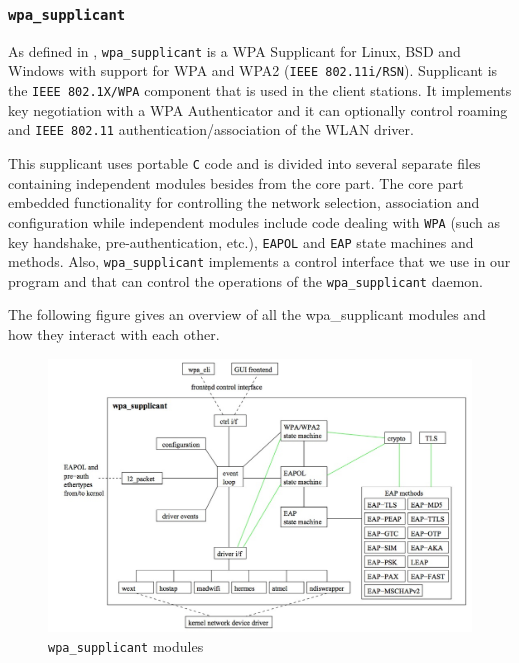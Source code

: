 \subsubsection{\texttt{wpa\_supplicant}} %
 As defined in \cite{wpa-supplicant}, \texttt{wpa\_supplicant} is a WPA Supplicant for Linux, BSD and Windows with support for WPA and WPA2 (\texttt{IEEE 802.11i/RSN}). Supplicant is the \texttt{IEEE 802.1X/WPA} component that is used in the client stations. It implements key negotiation with a WPA Authenticator and it can optionally control roaming and \texttt{IEEE 802.11} authentication/association of the WLAN driver.

 This supplicant uses portable \texttt{C} code and is divided into several separate files containing independent modules besides from the core part. The core part embedded functionality for controlling the network selection, association and configuration while independent modules include code dealing with \texttt{WPA} (such as key handshake, pre-authentication, etc.), \texttt{EAPOL} and \texttt{EAP} state machines and methods. Also, \texttt{wpa\_supplicant} implements a control interface that we use in our program and that can control the operations of the \texttt{wpa\_supplicant} daemon.

The following figure gives an overview of all the wpa\_supplicant modules and how they interact with each other.

 \begin{figure}[H]
 	\begin{center}
		\includegraphics[width=1\linewidth]{Pictures/chapter4/wpa-supplicant-modules.jpg}
		\caption{\texttt{wpa\_supplicant} modules}
	\end{center}
\end{figure}

